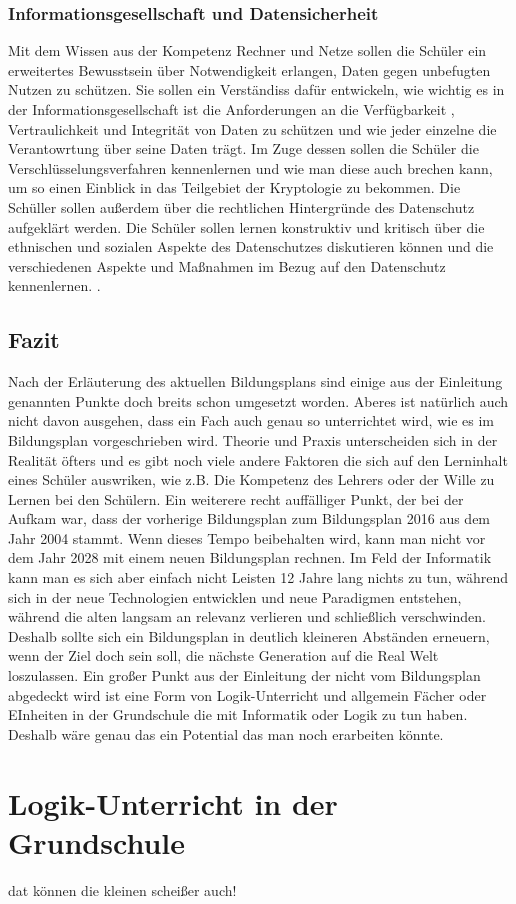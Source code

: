 \subsubsection{Informationsgesellschaft und Datensicherheit}

Mit dem Wissen aus der Kompetenz Rechner und Netze sollen die Schüler ein erweitertes Bewusstsein über Notwendigkeit erlangen, Daten gegen unbefugten Nutzen zu schützen. Sie sollen ein Verständiss dafür entwickeln, wie wichtig es in der Informationsgesellschaft ist die Anforderungen an die Verfügbarkeit , Vertraulichkeit und Integrität von Daten zu schützen und wie jeder einzelne die Verantowrtung über seine Daten trägt. Im Zuge dessen sollen die Schüler die Verschlüsselungsverfahren kennenlernen und wie man diese auch brechen kann, um so einen Einblick in das Teilgebiet der Kryptologie zu bekommen. Die Schüller sollen außerdem über die rechtlichen Hintergründe des Datenschutz aufgeklärt werden. Die Schüler sollen lernen konstruktiv und kritisch über die ethnischen und sozialen Aspekte des Datenschutzes diskutieren können und die verschiedenen Aspekte und Maßnahmen im Bezug auf den Datenschutz kennenlernen.
\cite{InfoGes}.

\subsection{Fazit}
Nach der Erläuterung des aktuellen Bildungsplans sind einige aus der Einleitung genannten Punkte doch breits schon umgesetzt worden. Aberes ist natürlich auch nicht davon ausgehen, dass ein Fach auch genau so unterrichtet wird, wie es im Bildungsplan vorgeschrieben wird. Theorie und Praxis unterscheiden sich in der Realität öfters und es gibt noch viele andere Faktoren die sich auf den Lerninhalt eines Schüler auswriken, wie z.B. Die Kompetenz des Lehrers oder der Wille zu Lernen bei den Schülern. Ein weiterere recht auffälliger Punkt, der bei der Aufkam war, dass der vorherige Bildungsplan zum Bildungsplan 2016 aus dem Jahr 2004 stammt. Wenn dieses Tempo beibehalten wird, kann man nicht vor dem Jahr 2028 mit einem neuen Bildungsplan rechnen. Im Feld der Informatik kann man es sich aber einfach nicht Leisten 12 Jahre lang nichts zu tun, während sich in der neue Technologien entwicklen und neue Paradigmen entstehen, während die alten langsam an relevanz verlieren und schließlich verschwinden. Deshalb sollte sich ein Bildungsplan in deutlich kleineren Abständen erneuern, wenn der Ziel doch sein soll, die nächste Generation auf die Real Welt loszulassen. Ein großer Punkt aus der Einleitung der nicht vom Bildungsplan abgedeckt wird ist eine Form von Logik-Unterricht und allgemein Fächer oder EInheiten in der Grundschule die mit Informatik oder Logik zu tun haben. Deshalb wäre genau das ein Potential das man noch erarbeiten könnte.

\section{Logik-Unterricht in der Grundschule}
dat können die kleinen scheißer auch!